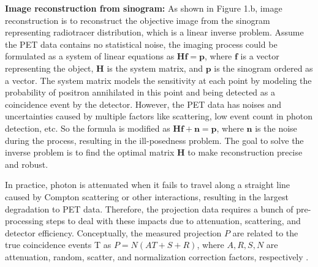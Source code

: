 \documentclass[11pt,a4paper]{article}
\begin{document}
    \noindent\textbf{Image reconstruction from sinogram:} As shown in Figure 1.b, image reconstruction is to reconstruct the objective image from the sinogram representing radiotracer distribution, which is a linear inverse problem. Assume the PET data contains no statistical noise, the imaging process could be formulated as a system of linear equations as $\mathbf{Hf=p}$, where $\mathbf{f}$ is a vector representing the object, $\mathbf{H}$ is the system matrix, and $\mathbf{p}$ is the sinogram ordered as a vector. The system matrix models the sensitivity at each point by modeling the probability of positron annihilated in this point and being detected as a coincidence event by the detector. However, the PET data has noises and uncertainties caused by multiple factors like scattering, low event count in photon detection, etc. So the formula is modified as $\mathbf{Hf+n=p}$, where $\mathbf{n}$ is the noise during the process, resulting in the ill-posedness problem. The goal to solve the inverse problem is to find the optimal matrix $\mathbf{H}$ to make reconstruction precise and robust.

    In practice, photon is attenuated when it fails to travel along a straight line caused by Compton scattering or other interactions, resulting in the largest degradation to PET data. Therefore, the projection data requires a bunch of pre-processing steps to deal with these impacts due to attenuation, scattering, and detector efficiency. 
    Conceptually, the measured projection $P$ are related to the true coincidence events T as $P=N(AT+S+R)$, where $A,R,S,N$ are attenuation, random, scatter, and normalization correction factors, respectively \cite{tong2010petctreview}.  

    \vspace{-0.5cm}
\end{document}
